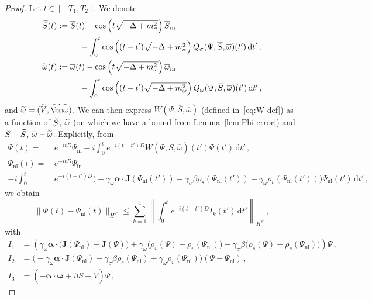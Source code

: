 \documentclass[AHL,Unicode,longabstracts,published]{cedram}
\newcommand{\rmin}{\mathrm{in}}
\newcommand{\nl}{\mathrm{nl}}
\renewcommand\tilde{\widetilde}
\renewcommand\d[1]{{\ensuremath{\,\text{d}#1}}}
\let\oldtilde\tilde
\renewcommand*{\tilde}[1]{\mathchoice{\widetilde{#1}}{\widetilde{#1}}{\oldtilde{#1}}{\oldtilde{#1}}}
\begin{document}
\begin{proof}
Let $t\in [-T_1,T_2]$. We denote
\begin{equation}\label{eq:tilde-fields}
\begin{split}
\tilde S(t)&:=\overline{S}(t)- \cos\left(t\sqrt{-\Delta + m^2_\sigma}\right)\overline{S}_\rmin \\
&\mkern50mu-\int_0^t\cos\left((t-t')\sqrt{-\Delta + m^2_\sigma}\right) Q_\sigma(\Psi,\overline{S}, \overline{\omega})(t')\d t'\,,\\
\tilde \omega(t)&:=\overline\omega(t)-\cos\left(t\sqrt{-\Delta + m^2_\omega}\right)\overline\omega_\rmin \\
&\mkern50mu-\int_0^t\cos\left((t-t')\sqrt{-\Delta + m^2_\omega}\right) Q_\omega(\Psi,\overline{S}, \overline{\omega})(t')\d t'\,,
\end{split}
\end{equation}
and $\tilde \omega =(\tilde V, \tilde{\bm\omega})$. We can then express $W(\Psi, \overline{S}, \overline{\omega})$ (defined in~\eqref{eq:W-def}) as a function of $\tilde S$, $\tilde \omega$ (on which we have a bound from Lemma~\ref{lem:Phi-error}) and $\overline{S}-\tilde{S}$, $\overline{\omega}-\tilde{\omega}$. Explicitly, from
\begin{align*}
\Psi(t) = &e^{-itD}\Psi_\rmin -i\int_0^te^{-i(t-t')D}W(\Psi, \overline{S}, \overline{\omega})(t')\Psi(t')\d t'\,,\\
\Psi_{\nl}(t) =\, &e^{-itD}\Psi_\rmin\\
-i\int_0^t &e^{-i(t-t')D}\big(-\gamma_\omega{\bm\alpha}\cdot {\bm J}(\Psi_\nl(t'))-\gamma_\sigma\beta \rho_s(\Psi_{\nl}(t'))+\gamma_\omega\rho_v(\Psi_{\nl}(t'))\big)\Psi_{\nl}(t')\d t'\,,
\end{align*}
we obtain
\begin{equation}\label{eq:Psi diff}
\|\Psi_{}(t) -\Psi_{\nl}(t) \|_{H^{s'}}\leq \sum_{k=1}^4\left\|\int_0^te^{-i(t-t')D}I_k (t')\d t'\right\|_{H^{s'}}\,,
\end{equation}
with
\begin{align}
I_1&= \left(
\gamma_\omega {\bm\alpha}\cdot \big({\bm J}(\Psi_\nl) -{\bm J}(\Psi)\big) +\gamma_\omega\big(\rho_v(\Psi) - \rho_v(\Psi_{\nl})\big) -\gamma_\sigma \beta\big(\rho_s(\Psi) - \rho_s(\Psi_{\nl})\big)
\right)\Psi\,,\\
I_2&= \big(-\gamma_\omega{\bm\alpha}\cdot {\bm J}(\Psi_\nl)-\gamma_\sigma\beta \rho_s(\Psi_{\nl})+\gamma_\omega\rho_v(\Psi_{\nl})\big)(\Psi-\Psi_\nl) \,,
\\
I_3&=
\left(-\bm\alpha\cdot \widetilde{\bm \omega_{}}+\beta \widetilde{S}+\widetilde{V}\right)\Psi\,,

\end{align}
\end{proof}
\end{document}
